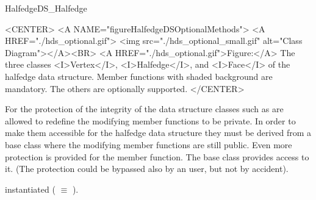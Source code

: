 \begin{ccRefConcept}{HalfedgeDS_Halfedge}
\begin{ccHtmlOnly}
    <CENTER>
    <A NAME="figureHalfedgeDSOptionalMethods">
    <A HREF="./hds_optional.gif">
        <img src="./hds_optional_small.gif" 
             alt="Class Diagram"></A><BR>
    <A HREF="./hds_optional.gif">Figure:</A>
    The three classes <I>Vertex</I>, <I>Halfedge</I>, and 
          <I>Face</I> of the halfedge data structure. Member
          functions with shaded background are mandatory. The others
          are optionally supported.
    </CENTER>
\end{ccHtmlOnly}

For the protection of the integrity of the data structure classes such
as  are allowed to redefine the modifying member
functions to be private. In order to make them accessible for the
halfedge data structure they must be derived from a base class
 where the modifying member functions are still public. Even
more protection is provided for the  member
function. The base class  provides access to it.  (The
protection could be bypassed also by an user, but not by accident).

\ccTypes

\ccThreeToTwo

    {instantiated  ( $\equiv$ ).}
\ccGlue
{}
\ccGlue
{}
\ccGlue
{}
\ccGlue
{}

\ccGlue
{}
\ccGlue
{}
\ccGlue
{}
\ccGlue
{}
\ccGlue
{}

\ccGlue
{}
\ccGlue
{}

\ccCreation
{}


\ccOperations
\ccTagFullDeclarations


\end{ccRefConcept}
